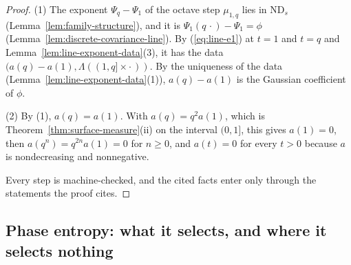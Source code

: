 \begin{proof}
(1) The exponent $\Psi_q - \Psi_1$ of the octave step $\mu_{1,q}$ lies in $\mathrm{ND}_s$
(Lemma~\ref{lem:family-structure}), and it is $\Psi_1(q\,\cdot) - \Psi_1 = \phi$
(Lemma~\ref{lem:discrete-covariance-line}). By (\ref{eq:line-e1}) at $t = 1$ and $t = q$ and
Lemma~\ref{lem:line-exponent-data}(3), it has the data $(a(q) - a(1), \Lambda((1,q] \times \cdot\,))$.
By the uniqueness of the data (Lemma~\ref{lem:line-exponent-data}(1)), $a(q) - a(1)$ is the
Gaussian coefficient of $\phi$.

(2) By (1), $a(q) = a(1)$. With $a(q) = q^2a(1)$, which is Theorem~\ref{thm:surface-measure}(ii)
on the interval $(0,1]$, this gives $a(1) = 0$, then $a(q^n) = q^{2n}a(1) = 0$ for $n \ge 0$, and
$a(t) = 0$ for every $t > 0$ because $a$ is nondecreasing and nonnegative.

Every step is machine-checked, and the cited facts enter only through the statements the proof
cites.
\end{proof}

\subsection{Phase entropy: what it selects, and where it selects nothing}
\label{sec:line-phase-entropy}

